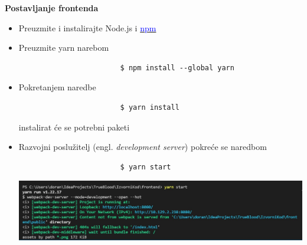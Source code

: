 			\textbf{Postavljanje frontenda}
			    \begin{itemize}
			        \item Preuzmite i instalirajte Node.js i			         \href{https://docs.npmjs.com/downloading-and-installing-node-js-and-npm}{\textcolor{blue}{npm}}
			        
			        \item Preuzmite yarn narebom 
			        \begin{verbatim}
			            $ npm install --global yarn
			        \end{verbatim}
			        
			        \item Pokretanjem naredbe
			        \begin{verbatim}
			            $ yarn install
			        \end{verbatim}
			        instalirat će se potrebni paketi
			        
			        \item Razvojni poslužitelj (engl. \textit{development server}) pokreće se naredbom 
			        \begin{verbatim}
			            $ yarn start
			        \end{verbatim}
			        
            	    \begin{minipage}{\linewidth}
                    	\includegraphics[scale=0.6]{slike/deploy/yarn-start.jpg} %
            			\centering
        		        \label{fig:yarnstart}
                    \end{minipage}
			        
			    \end{itemize}
			\eject
			    
